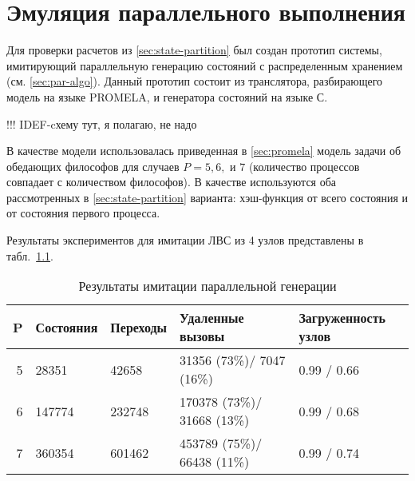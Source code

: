 \chapter{Эмуляция параллельного выполнения}
\label{cha:paremu}

Для проверки расчетов из \ref{sec:state-partition} был создан прототип
системы, имитирующий параллельную генерацию состояний с распределенным
хранением (см. \ref{sec:par-algo}). Данный прототип состоит из
транслятора, разбирающего модель на языке PROMELA, и генератора
состояний на языке С.

!!! IDEF-cхему тут, я полагаю, не надо

В качестве модели использовалась приведенная в \ref{sec:promela}
модель задачи об обедающих философов для случаев $P = 5, 6, \text{ и }
7$ (количество процессов совпадает с количеством философов). В
качестве  используются оба рассмотренных в
\ref{sec:state-partition} варианта: хэш-функция от всего состояния и
от состояния первого процесса. 

Результаты экспериментов для имитации ЛВС из 4 узлов представлены в
табл.~\ref{tab:paremu-stats}.

\begin{table}[ht]
  \centering
  \begin{tabular}[ht]{|r|l|l|l|p{}|}
    \hline
    P & Состояния & Переходы & Удаленные вызовы & Загруженность узлов    \\
    \hline
    5 & 28351     & 42658    & 31356  (73\%)/ 7047  (16\%) & 0.99 / 0.66 \\ 
    6 & 147774    & 232748   & 170378 (73\%)/ 31668 (13\%) & 0.99 / 0.68 \\ 
    7 & 360354    & 601462   & 453789 (75\%)/ 66438 (11\%) & 0.99 / 0.74 \\ 
    \hline
  \end{tabular}
  \caption{Результаты имитации параллельной генерации}
  \label{tab:paremu-stats}
\end{table}

